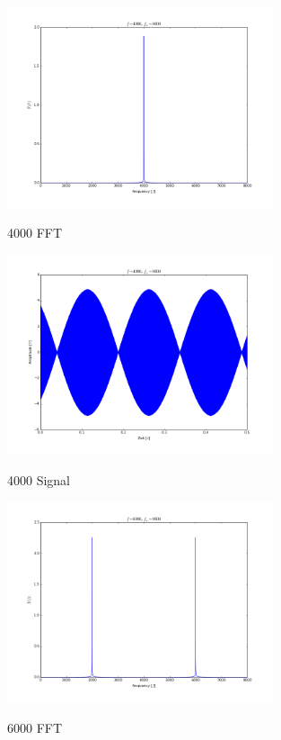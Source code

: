 \documentclass[TGAI_Laborbericht.tex]{subfiles}
\begin{document}
\begin{figure}[H]
	\includegraphics[width=0.7\textwidth]{media/4000-fft.png}
	\label{4000 FFT}
	\caption{4000 FFT}
\end{figure}

\begin{figure}[H]
	\includegraphics[width=0.7\textwidth]{media/4000-signal.png}
	\label{4000 Signal}
	\caption{4000 Signal}
\end{figure}

\begin{figure}[H]
	\includegraphics[width=0.7\textwidth]{media/6000-fft.png}
	\label{6000 FFT}
	\caption{6000 FFT}
\end{figure}
\end{document}
